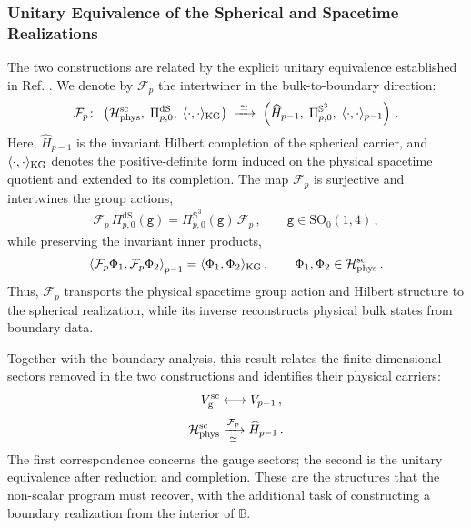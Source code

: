 \documentclass{SciPost}
\begin{document}
\subsubsection{Unitary Equivalence of the Spherical and Spacetime Realizations}

The two constructions are related by the explicit unitary equivalence established in Ref. \cite{Bajalan2026}. We denote by $\mathcal F_p$ the intertwiner in the bulk-to-boundary direction:
\begin{align}
    \mathcal F_p \colon\;
    \left(
        {\cal H}_{\rm phys}^{\rm sc},\;
        \Pi_{p,0}^{\mathrm{dS}},\;
        \langle\cdot,\cdot\rangle_{\rm KG}
    \right)
    \;\xrightarrow{\;\simeq\;}\;
    \left(
        \widehat H_{p-1},\;
        \Pi_{p,0}^{\mathbb S^3},\;
        \langle\cdot,\cdot\rangle_{p-1}
    \right) \,.
\end{align}
Here, $\widehat H_{p-1}$ is the invariant Hilbert completion of the spherical carrier, and $\langle\cdot,\cdot\rangle_{\rm KG}$ denotes the positive-definite form induced on the physical spacetime quotient and extended to its completion. The map $\mathcal F_p$ is surjective and intertwines the group actions,
\begin{align}
    \mathcal F_p\,
    \Pi_{p,0}^{\mathrm{dS}}(\texttt{g})
    =
    \Pi_{p,0}^{\mathbb S^3}(\texttt{g})\,
    \mathcal F_p \,,
    \qquad
    \texttt{g}\in\mathrm{SO}_0(1,4) \,,
\end{align}
while preserving the invariant inner products,
\begin{align}
    \left\langle
        \mathcal F_p\Phi_1,\mathcal F_p\Phi_2
    \right\rangle_{p-1}
    =
    \langle\Phi_1,\Phi_2\rangle_{\rm KG} \,,
    \qquad
    \Phi_1,\Phi_2\in{\cal H}_{\rm phys}^{\rm sc} \,.
\end{align}
Thus, $\mathcal F_p$ transports the physical spacetime group action and Hilbert structure to the spherical realization, while its inverse reconstructs physical bulk states from boundary data.

Together with the boundary analysis, this result relates the finite-dimensional sectors removed in the two constructions and identifies their physical carriers: \begin{align}
    V_{\rm g}^{\rm sc}
    &\longleftrightarrow V_{p-1} \,,
    \\[3pt]
    {\cal H}_{\rm phys}^{\rm sc}
    &\xrightarrow[\;\simeq\;]{\mathcal F_p}
    \widehat H_{p-1} \,.
\end{align}
The first correspondence concerns the gauge sectors; the second is the unitary equivalence after reduction and completion. These are the structures that the non-scalar program must recover, with the additional task of constructing a boundary realization from the interior of $\mathbb B$.
\end{document}
